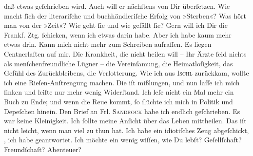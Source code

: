 \begin{ledgroupsized}[t]{13cm}
               daß etwas geſchrieben wird. Auch will er nächſtens \label{K_L02630-4v}\label{K_L02630-4h} von Dir überſetzen. Wie macht ſich der literariſche und
               buchhändleriſche Erfolg von »Sterben«?\pend
           \pstart
           Was hört man von der »Zeit«? Wie geht ſie und wie
               gefällt ſie?\pend
           \pstart
           Gern will ich Dir die Frankf. Ztg. ſchicken, wenn
               ich etwas darin habe. Aber ich habe kaum mehr etwas drin. Kann {\pb}mich nicht mehr zum Schreiben aufraffen. Es liegen
               Centnerlaſten auf mir. Die Krankheit, die nicht heilen will – Ihr Ärzte ſeid nichts
               als menſchenfreundliche Lügner – die Vereinſamung, die Heimatloſigkeit, das Gefühl
               des Zurückbleibens, die Verlotterung. Wie ich aus \textsc{Ischl} zurückkam, wollte ich eine Rieſen-Anſtrengung
               machen. Die iſt mißlungen, und nun laſſe ich mich ſinken und leiſte nur mehr wenig
               Widerſtand. Ich leſe nicht ein Mal mehr ein Buch zu Ende; und wenn die Reue kommt, ſo
               ſlüchte ich mich in Politik und Depeſchen hinein.\pend
           \pstart
           {\pb}Den Brief an Frl. \textsc{Sandrock} habe ich endlich geſchrieben. Es
               war keine Kleinigkeit. Ich ſollte meine Anſicht über das Leben mittheilen. Das iſt
               nicht leicht, wenn man viel zu thun hat. Ich habe ein idiotiſches Zeug abgeſchickt,
                  \textsc{\label{K_mets_Goldmann_94-partII-66v}\label{K_mets_Goldmann_94-partII-66h}},
               ich habe geantwortet.\pend
           \pstart
           Ich möchte ein wenig wiſſen, wie Du lebſt? Geſellſchaft? Freundſchaſt? Abenteuer?\pend
           \pstart
           \label{K_mets_Goldmann_94-partII-77v}
\end{ledgroupsized}
